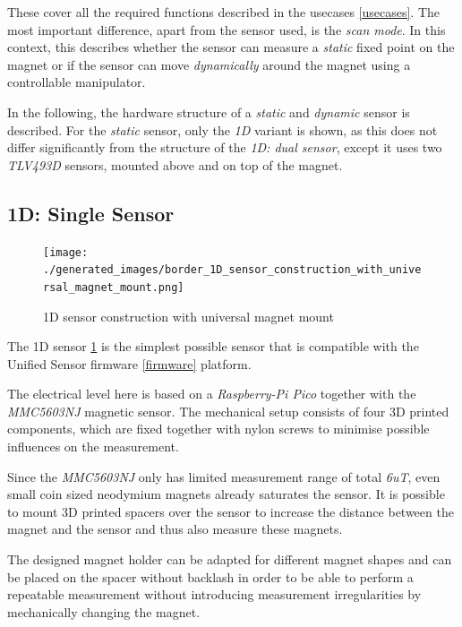 These cover all the required functions described in the usecases
\ref{usecases}. The most important difference, apart from the sensor
used, is the \emph{scan mode}. In this context, this describes whether
the sensor can measure a \emph{static} fixed point on the magnet or if
the sensor can move \emph{dynamically} around the magnet using a
controllable manipulator.

In the following, the hardware structure of a \emph{static} and
\emph{dynamic} sensor is described. For the \emph{static} sensor, only
the \emph{1D} variant is shown, as this does not differ significantly
from the structure of the \emph{1D: dual sensor}, except it uses two
\emph{TLV493D} sensors, mounted above and on top of the magnet.

\hypertarget{d-single-sensor}{%
\subsection{1D: Single Sensor}\label{d-single-sensor}}

\begin{figure}
\centering
\texttt{[image: ./generated\_images/border\_1D\_sensor\_construction\_with\_universal\_magnet\_mount.png]}
\caption{1D sensor construction with universal magnet mount
\label{1D_sensor_construction_with_universal_magnet_mount.png}}
\end{figure}

The 1D sensor
\ref{1D_sensor_construction_with_universal_magnet_mount.png} is the
simplest possible sensor that is compatible with the Unified Sensor
firmware \ref{firmware} platform.

The electrical level here is based on a \emph{Raspberry-Pi Pico}
together with the \emph{MMC5603NJ} magnetic sensor. The mechanical setup
consists of four 3D printed components, which are fixed together with
nylon screws to minimise possible influences on the measurement.

Since the \emph{MMC5603NJ} only has limited measurement range of total
\emph{6uT}, even small coin sized neodymium magnets already saturates
the sensor. It is possible to mount 3D printed spacers over the sensor
to increase the distance between the magnet and the sensor and thus also
measure these magnets.

The designed magnet holder can be adapted for different magnet shapes
and can be placed on the spacer without backlash in order to be able to
perform a repeatable measurement without introducing measurement
irregularities by mechanically changing the magnet.

